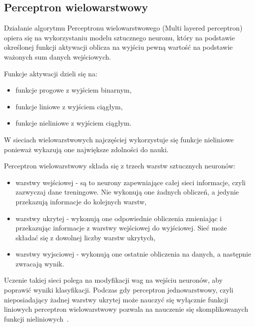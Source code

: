 \subsection{Perceptron wielowarstwowy}

Działanie algorytmu Perceptronu wielowarstwowego (Multi layered perceptron) 
opiera się na wykorzystaniu modelu sztucznego neuronu, który na podstawie określonej
funkcji aktywacji oblicza na wyjściu pewną wartość na podstawie ważonych sum danych
wejściowych. 

Funkcje aktywacji dzieli się na:
\begin{itemize}
    \item funkcje progowe z wyjściem binarnym,
    \item funkcje liniowe z wyjściem ciągłym,
    \item funkcje nieliniowe z wyjściem ciągłym.
\end{itemize}
W sieciach wielowarstwowych najczęściej wykorzystuje się funkcje nieliniowe ponieważ 
wykazują one największe zdolności do nauki.

Perceptron wielowarstwowy składa się z trzech warstw sztucznych neuronów: 
\begin{itemize}
    \item warstwy wejściowej - są to neurony zapewniające całej sieci
    informacje, czyli zazwyczaj dane treningowe. Nie wykonują one żadnych obliczeń,
    a jedynie przekazują informacje do kolejnych warstw,
    \item warstwy ukrytej - wykonują one odpowiednie obliczenia zmieniając 
    i przekazując informacje z warstwy wejściowej do wyjściowej. Sieć może składać
    się z dowolnej liczby warstw ukrytych,
    \item warstwy wyjsciowej - wykonują one ostatnie obliczenia na danych, 
    a następnie zwracają wynik.
\end{itemize}

Uczenie takiej sieci polega na modyfikacji wag na wejściu neuronów, aby poprawić
wyniki klasyfikacji. Podczas gdy perceptron jednowarstwowy, czyli nieposiadający żadnej warstwy ukrytej może 
nauczyć się wyłącznie funkcji liniowych perceptron wielowarstwowy pozwala na nauczenie
się skomplikowanych funkcji nieliniowych~\cite{MLAlgorithms}.

